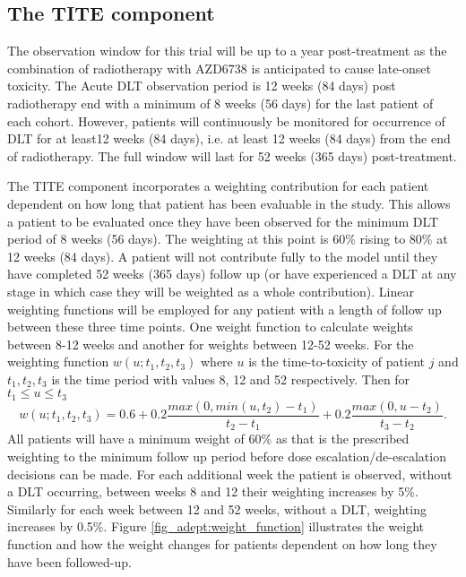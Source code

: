 \subsection{The TITE component}
\label{adept:The-TITE-component}

The observation window for this trial will be up to a year post-treatment as the combination of radiotherapy with AZD6738 is anticipated to cause late-onset toxicity. The Acute DLT observation period is 12 weeks (84 days) post radiotherapy end with a minimum of 8 weeks (56 days) for the last patient of each cohort. However, patients will continuously be monitored for occurrence of DLT for at least12 weeks (84 days), i.e. at least 12 weeks (84 days) from the end of radiotherapy. The full window will last for 52 weeks (365 days) post-treatment.

The TITE component incorporates a weighting contribution for each patient dependent on how long that patient has been evaluable in the study. This allows a patient to be evaluated once they have been observed for the minimum DLT period of 8 weeks (56 days). The weighting at this point is 60\% rising to 80\% at 12 weeks (84 days). A patient will not contribute fully to the model until they have completed 52 weeks (365 days) follow up (or have experienced a DLT at any stage in which case they will be weighted as a whole contribution). Linear weighting functions will be employed for any patient with a length of follow up between these three time points. One weight function to calculate weights between 8-12 weeks and another for weights between 12-52 weeks. For the weighting function $w(u;t_1, t_2, t_3)$ where $u$ is the time-to-toxicity of patient $j$ and $t_1, t_2, t_3$ is the time period with values 8, 12 and 52 respectively. Then for $t_1 \leq u \leq t_3$
\begin{equation}
w(u;t_1,t_2,t_3) = 0.6 + 0.2\frac{max(0, min(u, t_2) - t_1)}{t_2 - t_1} + 0.2\frac{max(0, u - t_2)}{t_3-t_2}.
\end{equation} 
All patients will have a minimum weight of 60\% as that is the prescribed weighting to the  minimum follow up period before dose escalation/de-escalation decisions can be made. For each additional week the patient is observed, without a DLT occurring, between weeks 8 and 12 their weighting increases by 5\%. Similarly for each week between 12 and 52 weeks, without a DLT, weighting increases by 0.5\%. Figure \ref{fig_adept:weight_function} illustrates the weight function and how the weight changes for patients dependent on how long they have been followed-up.   

